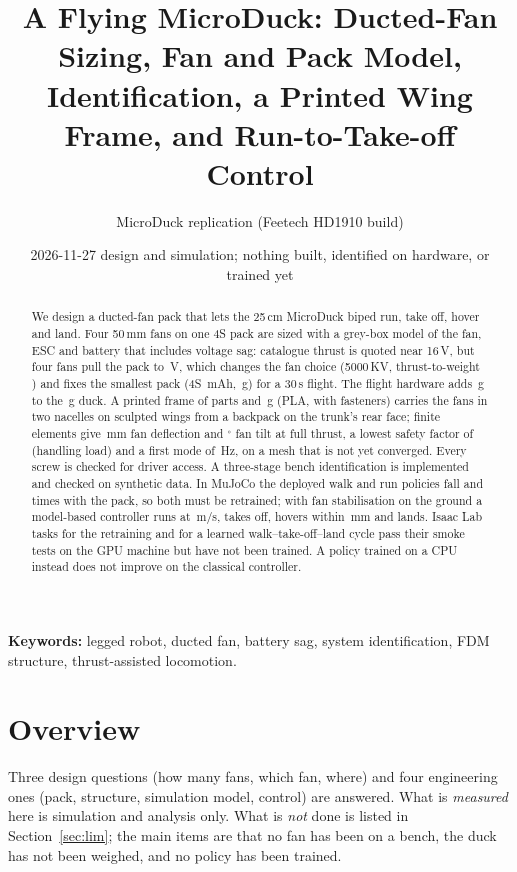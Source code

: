 \documentclass[11pt]{article}
\title{A Flying MicroDuck: Ducted-Fan Sizing, Fan and Pack Model, Identification, a Printed Wing Frame, and Run-to-Take-off Control}
\author{MicroDuck replication (Feetech HD1910 build)}
\date{2026-11-27 \quad design and simulation; nothing built, identified on hardware, or trained yet}
\begin{document}
\maketitle

\begin{abstract}
We design a ducted-fan pack that lets the 25\,cm MicroDuck biped run, take off, hover and land. Four
50\,mm fans on one 4S pack are sized with a grey-box model of the fan, ESC and battery that includes
voltage sag: catalogue thrust is quoted near 16\,V, but four fans pull the pack to
\fpPackVfull\,V, which changes the fan choice (5000\,KV, thrust-to-weight \fpPackTW) and fixes the
smallest pack (4S \fpPackMah\,mAh, \fpPackG\,g) for a 30\,s flight. The flight hardware adds
\frPackG\,g to the \flDuckG\,g duck. A printed frame of \frNParts{} parts and \frFramePLA\,g (PLA, with fasteners) carries the
fans in two nacelles on sculpted wings from a backpack on the trunk's rear face; finite elements give
\frStDefl\,mm fan deflection and \frStTilt$^\circ$ fan tilt at full thrust, a lowest safety factor of
\frStSfMin{} (handling load) and a first mode of \frStMode\,Hz, on a mesh that is not yet converged. Every
screw is checked for driver access. A three-stage
bench identification is implemented and checked on synthetic data. In MuJoCo the deployed walk and
run policies fall \frCarryWalkFalls{} and \frCarryRunFalls{} times with the pack, so both must be
retrained; with fan stabilisation on the ground a model-based controller runs at \frRoRun\,m/s,
takes off, hovers within \frRoZerr\,mm and lands. Isaac Lab tasks for the retraining and for a
learned walk--take-off--land cycle pass their smoke tests on the GPU machine but have not been trained. A policy
trained on a CPU instead does not improve on the classical controller.
\end{abstract}
\textbf{Keywords:} legged robot, ducted fan, battery sag, system identification, FDM structure,
thrust-assisted locomotion.

\section{Overview}
Three design questions (how many fans, which fan, where) and four engineering ones (pack, structure,
simulation model, control) are answered. What is \emph{measured} here is simulation and analysis
only. What is \emph{not} done is listed in Section~\ref{sec:lim}; the main items are that no fan has
been on a bench, the duck has not been weighed, and no policy has been trained.
\end{document}
